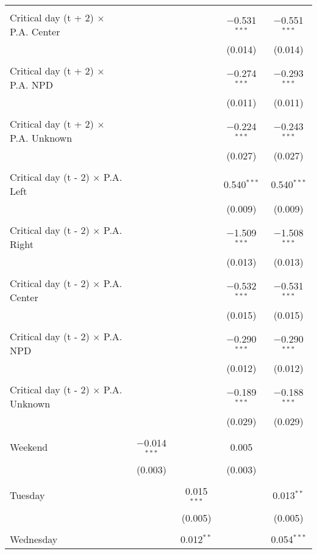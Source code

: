 \documentclass[
]{article}
\begin{document}
\begin{table}[!htbp]
{\begin{tabular}{@{\extracolsep{5pt}}lcccc}
  & & & & \\ 
 Critical day (t + 2) $\times$ P.A. Center &  &  & $-$0.531$^{***}$ & $-$0.551$^{***}$ \\ 
  &  &  & (0.014) & (0.014) \\ 
  & & & & \\ 
 Critical day (t + 2) $\times$ P.A. NPD &  &  & $-$0.274$^{***}$ & $-$0.293$^{***}$ \\ 
  &  &  & (0.011) & (0.011) \\ 
  & & & & \\ 
 Critical day (t + 2) $\times$ P.A. Unknown &  &  & $-$0.224$^{***}$ & $-$0.243$^{***}$ \\ 
  &  &  & (0.027) & (0.027) \\ 
  & & & & \\ 
 Critical day (t - 2) $\times$ P.A. Left &  &  & 0.540$^{***}$ & 0.540$^{***}$ \\ 
  &  &  & (0.009) & (0.009) \\ 
  & & & & \\ 
 Critical day (t - 2) $\times$ P.A. Right &  &  & $-$1.509$^{***}$ & $-$1.508$^{***}$ \\ 
  &  &  & (0.013) & (0.013) \\ 
  & & & & \\ 
 Critical day (t - 2) $\times$ P.A. Center &  &  & $-$0.532$^{***}$ & $-$0.531$^{***}$ \\ 
  &  &  & (0.015) & (0.015) \\ 
  & & & & \\ 
 Critical day (t - 2) $\times$ P.A. NPD &  &  & $-$0.290$^{***}$ & $-$0.290$^{***}$ \\ 
  &  &  & (0.012) & (0.012) \\ 
  & & & & \\ 
 Critical day (t - 2) $\times$ P.A. Unknown &  &  & $-$0.189$^{***}$ & $-$0.188$^{***}$ \\ 
  &  &  & (0.029) & (0.029) \\ 
  & & & & \\ 
 Weekend & $-$0.014$^{***}$ &  & 0.005 &  \\ 
  & (0.003) &  & (0.003) &  \\ 
  & & & & \\ 
 Tuesday &  & 0.015$^{***}$ &  & 0.013$^{**}$ \\ 
  &  & (0.005) &  & (0.005) \\ 
  & & & & \\ 
 Wednesday &  & 0.012$^{**}$ &  & 0.054$^{***}$ \\ 

\end{tabular}}
\end{table}
\end{document}
